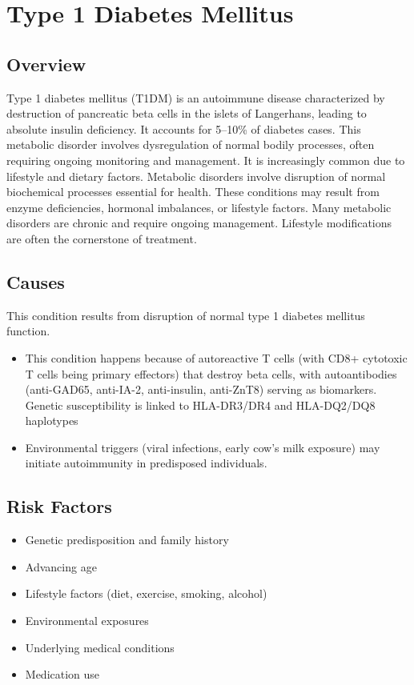 \chapter{Type 1 Diabetes Mellitus}
\label{sec:Type 1 Diabetes Mellitus}

\section{Overview}
Type 1 diabetes mellitus (T1DM) is an autoimmune disease characterized by destruction of pancreatic beta cells in the islets of Langerhans, leading to absolute insulin deficiency. It accounts for 5--10\% of diabetes cases. This metabolic disorder involves dysregulation of normal bodily processes, often requiring ongoing monitoring and management. It is increasingly common due to lifestyle and dietary factors. Metabolic disorders involve disruption of normal biochemical processes essential for health. These conditions may result from enzyme deficiencies, hormonal imbalances, or lifestyle factors. Many metabolic disorders are chronic and require ongoing management. Lifestyle modifications are often the cornerstone of treatment.
\section{Causes}
This condition results from disruption of normal type 1 diabetes mellitus function.

\begin{itemize}[noitemsep]
  \item This condition happens because of autoreactive T cells (with CD8+ cytotoxic T cells being primary effectors) that destroy beta cells, with autoantibodies (anti-GAD65, anti-IA-2, anti-insulin, anti-ZnT8) serving as biomarkers. Genetic susceptibility is linked to HLA-DR3/DR4 and HLA-DQ2/DQ8 haplotypes
  \item Environmental triggers (viral infections, early cow's milk exposure) may initiate autoimmunity in predisposed individuals.
\end{itemize}
\section{Risk Factors}
\begin{itemize}[noitemsep]
  \item Genetic predisposition and family history
  \item Advancing age
  \item Lifestyle factors (diet, exercise, smoking, alcohol)
  \item Environmental exposures
  \item Underlying medical conditions
  \item Medication use
\end{itemize}
